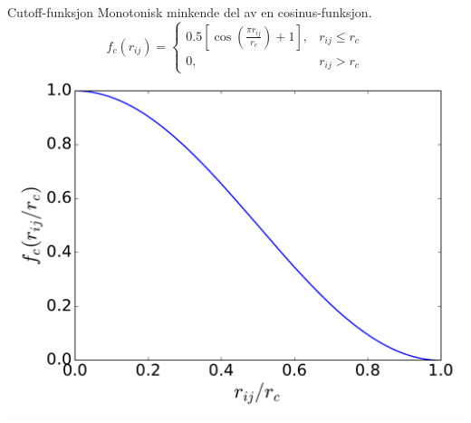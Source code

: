 \documentclass{beamer}
\begin{document}
\begin{frame}

\begin{block}{Cutoff-funksjon}
 Monotonisk minkende del av en cosinus-funksjon. 
 \begin{equation*}
  f_c(r_{ij}) = 
  \begin{cases}
   0.5 \!\left[\cos\left(\frac{\pi r_{ij}}{r_c}\right) + 1 \right], & r_{ij} \leq r_c \\
   0, & r_{ij} > r_c
  \end{cases}
 \end{equation*}
 \centering
 \includegraphics[width=0.7\linewidth]{../Figures/Presentation/cutoffFunction.pdf}
\end{block}

\end{frame}
\end{document}
